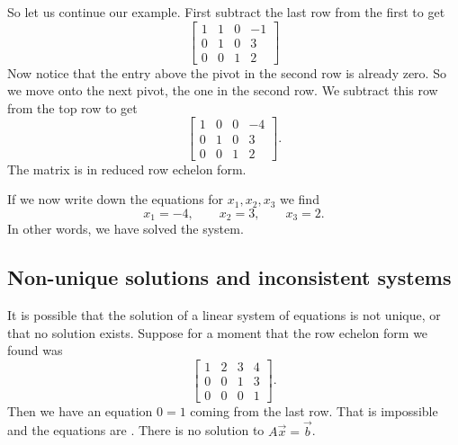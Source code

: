 So let us continue our example.
First subtract the last row from the first to get
\begin{equation*}
\left[
\begin{array}{ccc|c}
1 & 1 & 0 & -1 \\
0 & 1 & 0 & 3 \\
0 & 0 & 1 & 2 
\end{array}
\right]
\end{equation*}
Now notice that the entry above the pivot in the second row is already zero.
So we move onto the next pivot, the one in the second row.  We subtract
this row from the top row to get
\begin{equation*}
\left[
\begin{array}{ccc|c}
1 & 0 & 0 & -4 \\
0 & 1 & 0 & 3 \\
0 & 0 & 1 & 2 
\end{array}
\right] .
\end{equation*}
The matrix is in reduced row echelon form.

If we now write down the equations for $x_1,x_2,x_3$ we find
\begin{equation*}
x_1 = -4, \qquad x_2 = 3, \qquad x_3 = 2 .
\end{equation*}
In other words, we have solved the system.

\subsection{Non-unique solutions and inconsistent systems}

It is
possible that the solution of a linear system of equations
is not unique, or that no solution exists.  Suppose for a moment
that the row echelon form we found was
\begin{equation*}
\left[
\begin{array}{ccc|c}
1 & 2 & 3 & 4 \\
0 & 0 & 1 & 3 \\
0 & 0 & 0 & 1 
\end{array}
\right] .
\end{equation*}
Then we have an equation $0=1$ coming from the last row.  That is impossible
and the equations are \emph{}.  There is no solution
to $A \vec{x} = \vec{b}$.


